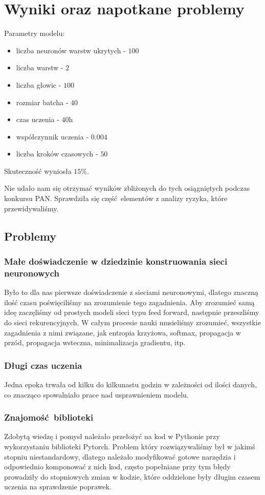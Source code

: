 \newpage
\section{Wyniki oraz napotkane problemy}

Parametry modelu:
\begin{itemize}
	  \item liczba neuronów warstw ukrytych - $100$
	  \item liczba warstw - $2$
	  \item liczba głowic - $100$
	  \item rozmiar batcha - $40$
	  \item czas uczenia - $40$h
	  \item współczynnik uczenia - $0.004$
	  \item liczba kroków czasowych - $50$
	\end{itemize}

Skuteczność wyniosła $15\%$.

Nie udało nam się otrzymać wyników zbliżonych do tych osiągniętych podczas konkursu PAN. Sprawdziła się
część elementów z analizy ryzyka, które przewidywaliśmy.

\subsection{Problemy}
\subsubsection{Małe doświadczenie w dziedzinie konstruowania sieci neuronowych}
Było to dla nas pierwsze doświadczenie z sieciami neuronowymi, dlatego znaczną ilość czasu poświęciliśmy na
zrozumienie tego zagadnienia. Aby zrozumieć samą ideę zaczęliśmy od prostych modeli sieci typu feed forward,
następnie przeszliśmy do sieci rekurencyjnych. W całym procesie nauki musieliśmy zrozumieć,
wszystkie zagadnienia z nimi związane, jak entropia krzyżowa, softmax, propagacja w przód, propagacja wsteczna,
minimalizacja gradientu, itp.

\subsubsection{Długi czas uczenia}
Jedna epoka trwała od kilku do kilkunastu godzin w zależności od ilości danych, co znacząco spowalniało
prace nad usprawnieniem modelu.

\subsubsection{Znajomość biblioteki}
Zdobytą wiedzę i pomysł należało przełożyć na kod w Pythonie przy wykorzystaniu biblioteki Pytorch.
Problem który rozwiązywaliśmy był w jakimś stopniu niestandardowy, dlatego należało modyfikować
gotowe narzędzia i odpowiednio komponować z nich kod, często popełniane przy tym błędy prowadziły
do stopniowych zmian w kodzie, które oddzielone były długim czasem uczenia na sprawdzenie poprawek.

